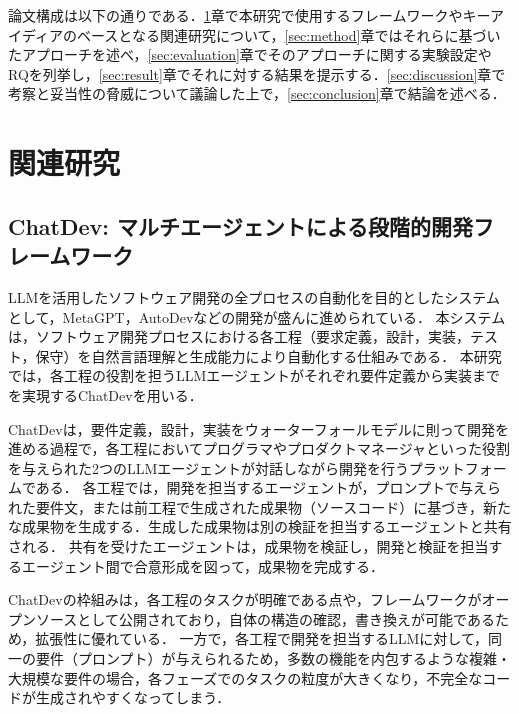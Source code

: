 \documentclass[submit,techrep,noauthor]{ipsj}
\begin{document}
論文構成は以下の通りである．\ref{sec:related}章で本研究で使用するフレームワークやキーアイディアのベースとなる関連研究について，\ref{sec:method}章ではそれらに基づいたアプローチを述べ，\ref{sec:evaluation}章でそのアプローチに関する実験設定やRQを列挙し，\ref{sec:result}章でそれに対する結果を提示する．\ref{sec:discussion}章で考察と妥当性の脅威について議論した上で，\ref{sec:conclusion}章で結論を述べる．


\section{関連研究}
\label{sec:related}

\subsection{ChatDev: マルチエージェントによる段階的開発フレームワーク}
LLMを活用したソフトウェア開発の全プロセスの自動化を目的としたシステムとして，MetaGPT，AutoDevなどの開発が盛んに進められている\cite{metagpt}\cite{autodev}．
本システムは，ソフトウェア開発プロセスにおける各工程（要求定義，設計，実装，テスト，保守）を自然言語理解と生成能力により自動化する仕組みである．
本研究では，各工程の役割を担うLLMエージェントがそれぞれ要件定義から実装までを実現するChatDev\cite{qian-etal-2024-chatdev}を用いる．

ChatDevは，要件定義，設計，実装をウォーターフォールモデルに則って開発を進める過程で，各工程においてプログラマやプロダクトマネージャといった役割を与えられた2つのLLMエージェントが対話しながら開発を行うプラットフォームである．
各工程では，開発を担当するエージェントが，プロンプトで与えられた要件文，または前工程で生成された成果物（ソースコード）に基づき，新たな成果物を生成する．生成した成果物は別の検証を担当するエージェントと共有される．
共有を受けたエージェントは，成果物を検証し，開発と検証を担当するエージェント間で合意形成を図って，成果物を完成する．

ChatDevの枠組みは，各工程のタスクが明確である点や，フレームワークがオープンソースとして公開されており，自体の構造の確認，書き換えが可能であるため，拡張性に優れている．
一方で，各工程で開発を担当するLLMに対して，同一の要件（プロンプト）が与えられるため，多数の機能を内包するような複雑・大規模な要件の場合，各フェーズでのタスクの粒度が大きくなり，不完全なコードが生成されやすくなってしまう．


\end{document}
